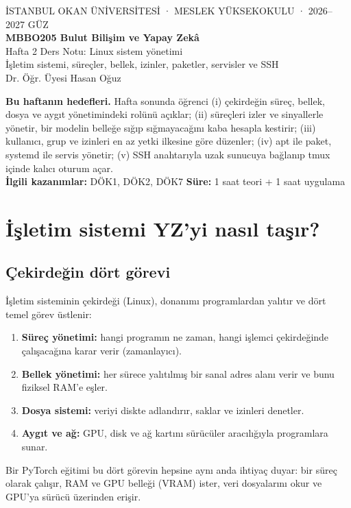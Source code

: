 \documentclass[11pt,a4paper]{article}
\begin{document}
\begin{tcolorbox}[colback=lacivert,colframe=lacivert,arc=2mm,left=5mm,right=5mm,top=4mm,bottom=4mm]
\color{white}\sffamily
{\small İSTANBUL OKAN ÜNİVERSİTESİ · MESLEK YÜKSEKOKULU · 2026–2027 GÜZ}\\[3mm]
{\LARGE\bfseries MBBO205 Bulut Bilişim ve Yapay Zekâ}\\[1mm]
{\large Hafta 2 Ders Notu: Linux sistem yönetimi}\\[1mm]
{\small İşletim sistemi, süreçler, bellek, izinler, paketler, servisler ve SSH}\\[3mm]
{\small Dr. Öğr. Üyesi Hasan Oğuz}
\end{tcolorbox}

\begin{kutu}
\textbf{Bu haftanın hedefleri.} Hafta sonunda öğrenci (i) çekirdeğin süreç, bellek, dosya ve aygıt yönetimindeki rolünü açıklar; (ii) süreçleri izler ve sinyallerle yönetir, bir modelin belleğe sığıp sığmayacağını kaba hesapla kestirir; (iii) kullanıcı, grup ve izinleri en az yetki ilkesine göre düzenler; (iv) apt ile paket, systemd ile servis yönetir; (v) SSH anahtarıyla uzak sunucuya bağlanıp tmux içinde kalıcı oturum açar. \\[1mm]
\textbf{İlgili kazanımlar:} DÖK1, DÖK2, DÖK7 \quad \textbf{Süre:} 1 saat teori + 1 saat uygulama
\end{kutu}

\tableofcontents

\section{İşletim sistemi YZ'yi nasıl taşır?}

\subsection{Çekirdeğin dört görevi}
İşletim sisteminin çekirdeği (Linux), donanımı programlardan yalıtır ve dört temel görev üstlenir:
\begin{enumerate}
  \item \textbf{Süreç yönetimi:} hangi programın ne zaman, hangi işlemci çekirdeğinde çalışacağına karar verir (zamanlayıcı).
  \item \textbf{Bellek yönetimi:} her sürece yalıtılmış bir sanal adres alanı verir ve bunu fiziksel RAM'e eşler.
  \item \textbf{Dosya sistemi:} veriyi diskte adlandırır, saklar ve izinleri denetler.
  \item \textbf{Aygıt ve ağ:} GPU, disk ve ağ kartını sürücüler aracılığıyla programlara sunar.
\end{enumerate}
Bir PyTorch eğitimi bu dört görevin hepsine aynı anda ihtiyaç duyar: bir süreç olarak çalışır, RAM ve GPU belleği (VRAM) ister, veri dosyalarını okur ve GPU'ya sürücü üzerinden erişir.
\end{document}
